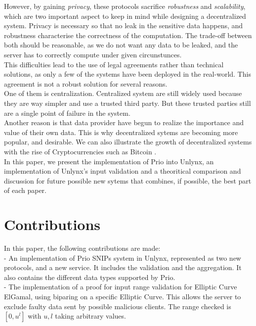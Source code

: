 \documentclass{article}
\begin{document}
However, by gaining \textit{privacy}, these protocols sacrifice \textit{robustness} and \textit{scalability}, which are two important aspect to keep in mind while designing a decentralized system. Privacy is necessary so that no leak in the sensitive data happens, and robustness characterise the correctness of the computation. The trade-off between both should be reasonable, as we do not want any data to be leaked, and the server has to correctly compute under given circunstunces.\\
This difficulties lead to the use of legal agreements rather than technical solutions, as only a few of the systems have been deployed in the real-world. This agreement is not a robust solution for several reasons.\\
One of them is centralization. Centralized system are still widely used \cite{dyadic,centralized} because they are way simpler and use a trusted third party. But these trusted parties still are a single point of failure in the system.\\
Another reason is that data provider have begun to realize the importance and value of their own data.
This is why decentralized sytems are becoming more popular, and desirable. We can also illustrate the growth of decentralized systems with the rise of Cryptocurrencies such as Bitcoin \cite{bitcoin}.\\
In this paper, we present the implementation of Prio into Unlynx, an implementation of Unlynx's input validation and a theoritical comparison and discussion for future possible new sytems that combines, if possible, the best part of each paper.
	
\section*{Contributions}
In this paper, the following contributions are made:\\
- An implementation of Prio SNIPs system in Unlynx, represented as two new protocols, and a new service. It includes the validation and the aggregation. It also contains the different data types supported by Prio.\\

- The implementation of a proof for input range validation for Elliptic Curve ElGamal, using biparing on a specific Elliptic Curve. This allows the server to exclude faulty data sent by possible malicious clients. The range checked is $[0,u^l]$ with $u,l$ taking arbitrary values. \\
\end{document}
